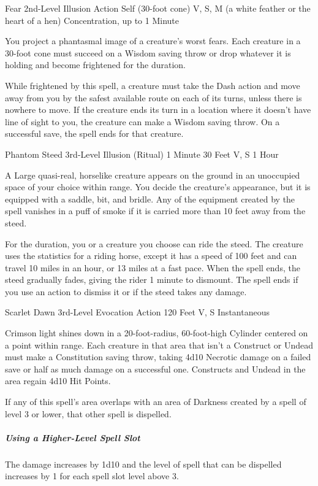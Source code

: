 \documentclass[letterpaper,openany,oneside,twocolumn]{book}
\begin{document}
\DndSpellHeader
  {Fear}
  {2nd-Level Illusion}
  {Action}
  {Self (30-foot cone)}
  {V, S, M (a white feather or the heart of a hen)}
  {Concentration, up to 1 Minute}

You project a phantasmal image of a creature's worst fears. Each creature in a 30-foot cone must succeed on a Wisdom saving throw or drop whatever it is holding and become frightened for the duration.

While frightened by this spell, a creature must take the Dash action and move away from you by the safest available route on each of its turns, unless there is nowhere to move. If the creature ends its turn in a location where it doesn't have line of sight to you, the creature can make a Wisdom saving throw. On a successful save, the spell ends for that creature.

\DndSpellHeader
  {Phantom Steed}
  {3rd-Level Illusion (Ritual)}
  {1 Minute}
  {30 Feet}
  {V, S}
  {1 Hour}

A Large quasi-real, horselike creature appears on the ground in an unoccupied space of your choice within range. You decide the creature's appearance, but it is equipped with a saddle, bit, and bridle. Any of the equipment created by the spell vanishes in a puff of smoke if it is carried more than 10 feet away from the steed.

For the duration, you or a creature you choose can ride the steed. The creature uses the statistics for a riding horse, except it has a speed of 100 feet and can travel 10 miles in an hour, or 13 miles at a fast pace. When the spell ends, the steed gradually fades, giving the rider 1 minute to dismount. The spell ends if you use an action to dismiss it or if the steed takes any damage.

\DndSpellHeader
  {Scarlet Dawn}
  {3rd-Level Evocation}
  {Action}
  {120 Feet}
  {V, S}
  {Instantaneous}

Crimson light shines down in a 20-foot-radius, 60-foot-high Cylinder centered on a point within range. Each creature in that area that isn't a Construct or Undead must make a Constitution saving throw, taking 4d10 Necrotic damage on a failed save or half as much damage on a successful one. Constructs and Undead in the area regain 4d10 Hit Points.

If any of this spell's area overlaps with an area of Darkness created by a spell of level 3 or lower, that other spell is dispelled.

\subparagraph*{Using a Higher-Level Spell Slot} The damage increases by 1d10 and the level of spell that can be dispelled increases by 1 for each spell slot level above 3.
\end{document}
